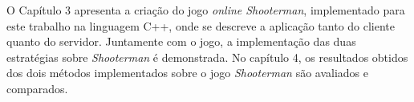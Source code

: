 O Capítulo 3 apresenta a criação do jogo \textit{online Shooterman}, implementado para este trabalho na linguagem C++, onde se descreve a aplicação tanto do cliente quanto do servidor. Juntamente com o jogo, a implementação das duas estratégias sobre \textit{Shooterman} é demonstrada. No capítulo 4, os resultados obtidos dos dois métodos implementados sobre o jogo \textit{Shooterman} são avaliados e comparados.
